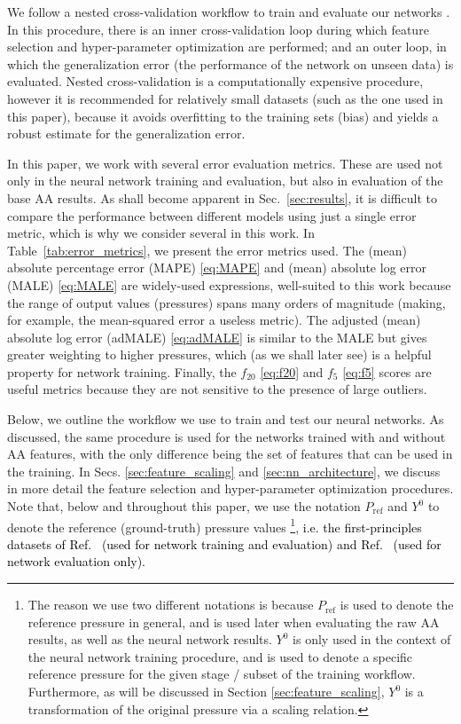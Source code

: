 \documentclass[%
 preprint,
 superscriptaddress,
 amsmath,amssymb,
longbibliography,
]{revtex4-2}
\newcommand{\change}[1]{\textcolor{black}{#1}}
\newcommand{\Pref}{P_\textrm{ref}}
\begin{document}
We follow a nested cross-validation workflow to train and evaluate our networks \cite{hastie_stats}. In this procedure, there is an inner cross-validation loop during which feature selection and hyper-parameter optimization are performed; and an outer loop, in which the generalization error (the performance of the network on unseen data) is evaluated. Nested cross-validation is a computationally expensive procedure, however it is recommended for relatively small datasets (such as the one used in this paper), because it avoids overfitting to the training sets (bias) and yields a robust estimate for the generalization error.

In this paper, we work with several error evaluation metrics. These are used not only in the neural network training and evaluation, but also in evaluation of the base AA results. As shall become apparent in Sec.~\ref{sec:results}, it is difficult to compare the performance between different models using just a single error metric, which is why we consider several in this work. In Table~\ref{tab:error_metrics}, we present the error metrics used. The (mean) absolute percentage error (MAPE) \eqref{eq:MAPE} and (mean) absolute log error (MALE) \eqref{eq:MALE} are widely-used expressions, well-suited to this work because the range of output values (pressures) spans many orders of magnitude (making, for example, the mean-squared error a useless metric). The adjusted (mean) absolute log error (adMALE) \eqref{eq:adMALE} is similar to the MALE but gives greater weighting to higher pressures, which (as we shall later see) is a helpful property for network training. Finally, the $f_{20}$ \eqref{eq:f20} and $f_5$ \eqref{eq:f5} scores are useful metrics because they are not sensitive to the presence of large outliers.

Below, we outline the workflow we use to train and test our neural networks. As discussed, the same procedure is used for the networks trained with and without AA features, with the only difference being the set of features that can be used in the training. In Secs. \ref{sec:feature_scaling} and \ref{sec:nn_architecture}, we discuss in more detail the feature selection and hyper-parameter optimization procedures. Note that, below and throughout this paper, we use the notation $\Pref$ and $Y^0$ to denote the reference (ground-truth) pressure values \change{\footnote{The reason we use two different notations is because $\Pref$ is used to denote the reference pressure in general, and is used later when evaluating the raw AA results, as well as the neural network results.  $Y^0$ is only used in the context of the neural network training procedure, and is used to denote a specific reference pressure for the given stage / subset of the training workflow. Furthermore, as will be discussed in Section \ref{sec:feature_scaling},  $Y^0$ is a transformation of the original pressure via a scaling relation.}}, \change{i.e. the first-principles datasets of Ref.~\onlinecite{Militzer_EOS_database} (used for network training and evaluation) and Ref.~\onlinecite{Hu_Be_EOS} (used for network evaluation only).}
\end{document}

